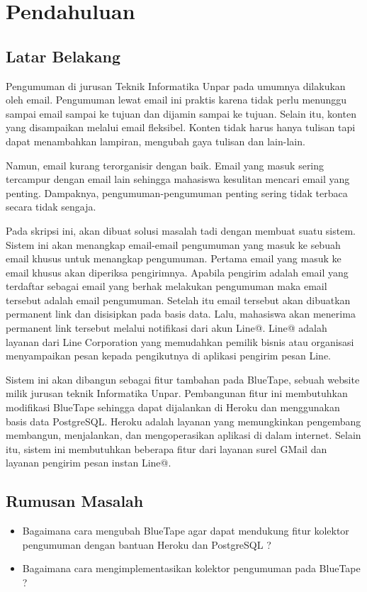 \chapter{Pendahuluan}
\label{chap:pendahuluan}
   
\section{Latar Belakang}
\label{sec:latarBelakang}
Pengumuman di jurusan Teknik Informatika Unpar pada umumnya dilakukan oleh email. Pengumuman lewat email ini praktis karena tidak perlu menunggu sampai email sampai ke tujuan dan dijamin sampai ke tujuan. Selain itu, konten yang disampaikan melalui email fleksibel. Konten tidak harus hanya tulisan tapi dapat menambahkan lampiran, mengubah gaya tulisan dan lain-lain.

Namun, email kurang terorganisir dengan baik. Email yang masuk sering tercampur dengan email lain sehingga mahasiswa kesulitan mencari email yang penting. Dampaknya, pengumuman-pengumuman penting sering tidak terbaca secara tidak sengaja.

Pada skripsi ini, akan dibuat solusi masalah tadi dengan membuat suatu sistem. Sistem ini akan menangkap email-email pengumuman yang masuk ke sebuah email khusus untuk menangkap pengumuman. Pertama email yang masuk ke email khusus akan diperiksa pengirimnya. Apabila pengirim adalah email yang terdaftar sebagai email yang berhak melakukan pengumuman maka email tersebut adalah email pengumuman. Setelah itu email tersebut akan dibuatkan permanent link dan disisipkan pada basis data. Lalu, mahasiswa akan menerima permanent link tersebut melalui notifikasi dari akun Line@. Line@ adalah layanan dari Line Corporation yang memudahkan pemilik bisnis atau organisasi menyampaikan pesan kepada pengikutnya di aplikasi pengirim pesan Line.

Sistem ini akan dibangun sebagai fitur tambahan pada BlueTape, sebuah website milik jurusan teknik Informatika Unpar. Pembangunan fitur ini membutuhkan modifikasi BlueTape sehingga dapat dijalankan di Heroku dan menggunakan basis data PostgreSQL. Heroku adalah layanan yang memungkinkan pengembang membangun, menjalankan, dan mengoperasikan aplikasi di dalam internet. Selain itu, sistem ini membutuhkan beberapa fitur dari layanan surel GMail dan layanan pengirim pesan instan Line@.

\section{Rumusan Masalah}
\label{sec:rumusanmasalah}
\begin{itemize}
\item Bagaimana cara mengubah BlueTape agar dapat mendukung fitur kolektor pengumuman dengan bantuan Heroku dan PostgreSQL ?
\item Bagaimana cara mengimplementasikan kolektor pengumuman pada BlueTape ?
\end{itemize}


